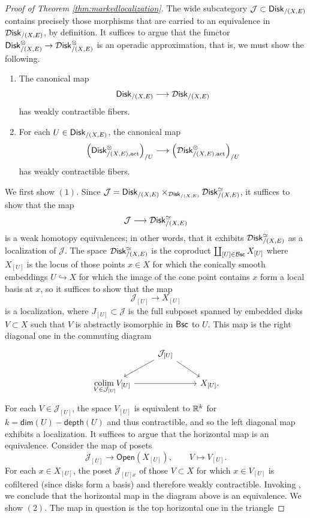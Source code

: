 \documentclass[10pt, reqno, twoside
, final
]{amsart}
\numberwithin{equation}{subsection}%
\theoremstyle{definition}
\theoremstyle{definition}
\theoremstyle{definition}
\theoremstyle{definition}
\theoremstyle{definition}
\theoremstyle{definition}
\theoremstyle{definition}
\theoremstyle{definition}
\theoremstyle{definition}
\theoremstyle{plain}
\theoremstyle{definition}
\theoremstyle{plain}
\theoremstyle{definition}
\theoremstyle{plain}
\theoremstyle{definition}
\theoremstyle{definition}
\theoremstyle{plain}
\theoremstyle{plain}
\theoremstyle{definition}
\theoremstyle{plain}
\theoremstyle{plain}
\theoremstyle{plain}
\begin{document}
\begin{proof}[Proof of Theorem \ref{thm:markedlocalization}]
The wide subcategory $\mathcal{J}\subset\mathsf{Disk}_{/(X,E)}$ contains precisely those morphisms that are carried to an equivalence in $\mathcal{D}\mathsf{isk}_{/(X,E)}$, by definition. It suffices to argue that the functor $\mathsf{Disk}^{\otimes}_{/(X,E)} \rightarrow \mathcal{D}\mathsf{isk}^{\otimes}_{/(X,E)}$ is an operadic approximation, that is, we must show the following.
\begin{enumerate}[$(1)$]
    \item The canonical map 
    \[ \mathsf{Disk}_{/(X,E)}  \longrightarrow \mathcal{D}\mathsf{isk}_{/(X,E)}   \]
    has weakly contractible fibers.
    \item For each $U\in \mathsf{Disk}_{/(X,E)}$, the canonical map 
    \[\left(\mathsf{Disk}_{/(X,E),\mathrm{act}}^{\otimes}\right)_{/U} \longrightarrow \left(\mathcal{D}\mathsf{isk}_{/(X,E),\mathrm{act}}^{\otimes}\right)_{/U}\]
    has weakly contractible fibers.
\end{enumerate}
We first show $(1)$. Since $\mathcal{J}=\mathsf{Disk}_{/(X,E)}\times_{ \mathcal{D}\mathsf{isk}_{/(X,E)}} \mathcal{D}\mathsf{isk}_{/(X,E)}^{\simeq}$, it suffices to show that the map 
\[ \mathcal{J}\longrightarrow   \mathcal{D}\mathsf{isk}_{/(X,E)}^{\simeq} \]
is a weak homotopy equivalences; in other words, that it exhibits $\mathcal{D}\mathsf{isk}_{/(X,E)}^{\simeq}$ as a localization of $\mathcal{J}$. The space $ \mathcal{D}\mathsf{isk}_{/(X,E)}^{\simeq} $ is the coproduct $\coprod_{[U]\in\mathcal{B}\mathsf{sc}}X_{[U]}$ where $X_{[U]}$ is the locus of those points $x\in X$ for which the conically smooth embeddings $U\hookrightarrow X$ for which the image of the cone point contains $x$ form a local basis at $x$, so it suffices to show that the map 
\[  \mathcal{J}_{[U]}\longrightarrow X_{[U]}    \]
is a localization, where $J_{[U]}\subset \mathcal{J}$ is the full subposet spanned by embedded disks $V\subset X$ such that $V$ is abstractly isomorphic in $\mathsf{Bsc}$ to $U$. This map is the right diagonal one in the commuting diagram
\[
\begin{tikzcd}
   & \mathcal{J}_{[U]} \ar[dr] \ar[dl]\\
   \underset{V\in \mathcal{J}_{[U]}}{\colim}V_{[U]} \ar[rr] && X_{[U]}.
\end{tikzcd}
\]
For each $V\in \mathcal{J}_{[U]}$, the space $V_{[U]}$ is equivalent to $\mathbb{R}^k$ for $k=\mathsf{dim}(U)-\mathsf{depth}(U)$ and thus contractible, and so the left diagonal map exhibits a localization. It suffices to argue that the horizontal map is an equivalence. Consider the map of posets
\[  \mathcal{J}_{[U]}\longrightarrow\mathsf{Open}(X_{[U]}),\quad\quad V\longmapsto V_{[U]}. \]
For each $x\in X_{[U]}$, the poset $\mathcal{J}_{[U]x}$ of those $V\subset X$ for which $x\in V_{[U]}$ is cofiltered (since disks form a basis) and therefore weakly contractible. Invoking \cite[Theorem A.3.1]{LurHA}, we conclude that the horizontal map in the diagram above is an equivalence. We show $(2)$. The map in question is the top horizontal one in the triangle

\end{proof}
\end{document}

